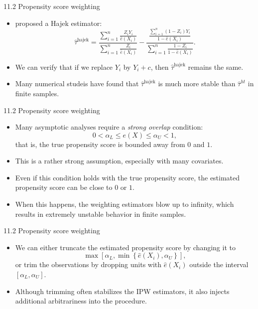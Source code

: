 \documentclass[aspectratio=169, 12pt]{beamer}
\begin{document}
\begin{frame}{11.2 Propensity score weighting}
  \begin{itemize}
    \item \citet{hajek1971comment} proposed a Hajek estimator:
    \[
    \hat{\tau}^{\text{hajek}} = \frac{\sum_{i=1}^{n}\frac{Z_iY_i}{\hat{e}(X_i)}}{\sum_{i=1}^{n}\frac{Z_i}{\hat{e}(X_i)}} - \frac{\frac{\sum_{i=1}^{n}(1-Z_i)Y_i}{1-\hat{e}(X_i)}}{\sum_{i=1}^{n}\frac{1-Z_i}{1-\hat{e}(X_i)}}.
    \]
    \item We can verify that if we replace $Y_i$ by $Y_i+c$, then $\hat{\tau}^{\text{hajek}}$ remains the same.
    \item Many numerical studeis have found that $\hat{\tau}^{\text{hajek}}$ is much more stable than $\hat{\tau}^{ht}$ in finite samples.
  \end{itemize}
\end{frame}

\begin{frame}{11.2 Propensity score weighting}
  \begin{itemize}
    \item Many asymptotic analyses require a \textit{strong overlap} condition: 
    \[
    0<\alpha_L\leq e(X)\leq\alpha_U<1,
    \]
    that is, the true propensity score is bounded away from $0$ and $1.$
    \item This is a rather strong assumption, especially with many covariates.
    \item Even if this condition holds with the true propensity score, the estimated propensity score can be close to $0$ or $1$.
    \item When this happens, the weighting estimators blow up to infinity, which results in extremely unstable behavior in finite samples.
  \end{itemize}
\end{frame}

\begin{frame}{11.2 Propensity score weighting}
  \begin{itemize}
    \item We can either truncate the estimated propensity score by changing it to 
    \[
    \max\left[\alpha_L,\min\left\{\hat{e}(X_i),\alpha_U\right\}\right],
    \]
    or trim the observations by dropping units with $\hat{e}(X_i)$ outside the interval $[\alpha_L,\alpha_U]$.
    \item Although trimming often stabilizes the IPW estimators, it also injects additional arbitrariness into the procedure.
  \end{itemize}
\end{frame}
\end{document}

